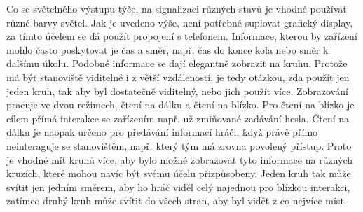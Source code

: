 


Co se světelného výstupu týče, na signalizaci různých stavů je vhodné používat různé barvy světel.
Jak je uvedeno výše, není potřebné suplovat grafický display, za tímto účelem se dá použít propojení s telefonem.
Informace, kterou by zařízení mohlo často poskytovat je čas a směr, např. čas do konce kola nebo směr k dalšímu úkolu.
Podobné informace se dají elegantně zobrazit na kruhu.
Protože má být stanoviště viditelné i z větší vzdálenosti, je tedy otázkou, zda použít jen jeden kruh, tak aby byl dostatečně viditelný, nebo jich použít více. %
Zobrazování pracuje ve dvou režimech, čtení na dálku a čtení na blízko.
Pro čtení na blízko je cílem přímá interakce se zařízením např. už zmiňované zadávání hesla.
Čtení na dálku je naopak určeno pro předávání informací hráči, když právě přímo neinteraguje se stanovištěm, např. který tým má zrovna povolený přístup.
Proto je vhodné mít kruhů více, aby bylo možné zobrazovat tyto informace na různých kruzích, které mohou navíc být svému účelu přizpůsobeny.
Jeden kruh tak může svítit jen jedním směrem, aby ho hráč viděl celý najednou pro blízkou interakci, zatímco druhý kruh může svítit do všech stran, aby byl vidět z co nejvíce míst.

